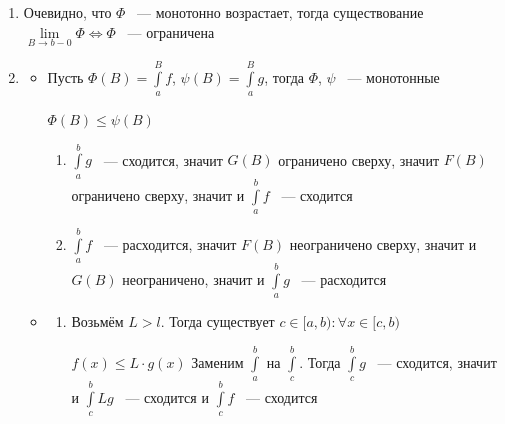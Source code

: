 \documentclass{article}
\begin{document}
            \begin{enumerate}
            
                \item Очевидно, что $\Phi$ ~--- монотонно возрастает, тогда существование $\lim\limits_{B \rightarrow b - 0} \Phi \Longleftrightarrow \Phi$ ~--- ограничена
                
                \item 
                
                    \begin{itemize}
                    
                        \item Пусть $\Phi(B) = \int\limits^B_a f$, $\psi(B) = \int\limits^B_a g$, тогда $\Phi$, $\psi$ ~--- монотонные 
                        
                            $\Phi(B) \leq \psi(B)$
                            
                            \begin{enumerate}
                            
                                \item $\int\limits^b_a g$ ~--- сходится, значит $G(B)$ ограничено сверху, значит $F(B)$ ограничено сверху, значит и $\int\limits^b_a f$ ~--- сходится
                                
                                \item $\int\limits^b_a f$ ~--- расходится, значит $F(B)$ неограничено сверху, значит и $G(B)$ неограничено, значит и $\int\limits^b_a g$ ~--- расходится
                                
                            \end{enumerate}
                        
                        \item 
                            
                            \begin{enumerate}
                            
                                \item Возьмём $L > l$. Тогда существует $c \in [a, b) : \forall x \in [c, b)$
                                
                                    $f(x) \leq L \cdot g(x)$ Заменим $\int\limits^b_a$ на $\int\limits^b_c$. Тогда $\int\limits^b_c g$ ~--- сходится, значит и $\int\limits^b_c L g$ ~--- сходится и $\int\limits^b_c f$ ~--- сходится
                                

\end{enumerate}
\end{itemize}
\end{enumerate}
\end{document}

